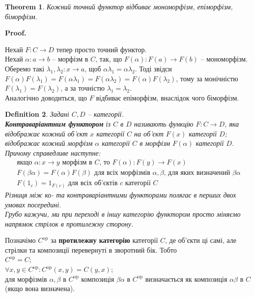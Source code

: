 \documentclass[a4paper, 10pt]{article}
\makeatletter
\theoremstyle{theoremdd}
\newtheorem{theorem}{Theorem}[subsection]
\newtheorem{definition}[theorem]{Definition}
\renewenvironment{proof}[1][Proof.\\]{\par
\pushQED{\hfill \qed}%
\normalfont \topsep6\p@\@plus6\p@\relax
\trivlist
\item\relax
{\bfseries
#1\@addpunct{.}}\hspace\labelsep\ignorespaces
}{%
\popQED\endtrivlist\@endpefalse
}
\makeatother
\begin{document}
\begin{theorem}
Кожний точний функтор відбиває мономорфізм, епіморфізм, біморфізм.
\end{theorem}

\begin{proof}
Нехай $F \colon C \to D$ тепер просто точний функтор.\\
Нехай $\alpha \colon a \to b$ -- морфізм в $C$, так, що $F(\alpha) \colon F(a) \to F(b)$ -- мономорфізм. Оберемо такі $\lambda_1,\lambda_2 \colon x \to a$, щоб $\alpha \lambda_1 = \alpha \lambda_2$. Тоді звідси $F(\alpha)F(\lambda_1) = F(\alpha \lambda_1) = F(\alpha \lambda_2) = F(\alpha) F(\lambda_2)$, тому за монічністю $F(\lambda_1) = F(\lambda_2)$, а за точністю $\lambda_1 = \lambda_2$.\\
Аналогічно доводиться, що $F$ відбиває епіморфізм, внаслідок чого біморфізм.
\end{proof}

\begin{definition}
Задані $C,D$ -- категорії.\\
\textbf{Контраваріантним функтором} із $C$ в $D$ називають функцію $F \colon C \to D$, яка відображає кожний об'єкт $x$ категорії $C$ на об'єкт $F(x)$ категорії $D$; відображає кожний морфізм $\alpha$ категорії $C$ в морфізм $F(\alpha)$ категорії $D$. Причому справедливе наступне:
\begin{align*}
\text{якщо $\alpha \colon x \to y$ морфізм в $C$, то $F(\alpha) \colon F(y) \to F(x)$} \\
\text{$F(\beta \alpha) = F(\alpha) F(\beta)$ для всіх морфізмів $\alpha,\beta$, для яких визначений $\beta\alpha$} \\
\text{$F(1_c) = 1_{F(c)}$ для всіх об'єктів $c$ категорії $C$}
\end{align*}
Різниця між ко- та контраваріантними функторами полягає в перших двох умовах посередині.\\
Грубо кажучи, ми при переході в іншу категорію функтором просто міняємо напрямок стрілок в протилежну сторону.
\end{definition}

\noindent Позначімо $C^{\text{op}}$ за \textbf{протилежну категорію} категорії $C$, де об'єкти ці самі, але стрілки та композиції перевернуті в зворотний бік. Тобто\\
$C^{\text{op}} = C$;\\
$\forall x,y \in C^{\text{op}}: C^{\text{op}}(x,y) = C(y,x)$;\\
для морфізмів $\alpha,\beta$ в $C^{\text{op}}$ композиція $\beta \alpha$ в $C^{\text{op}}$ визначається як композиція $\alpha \beta$ в $C$ (якщо вона визначена).
\end{document}
